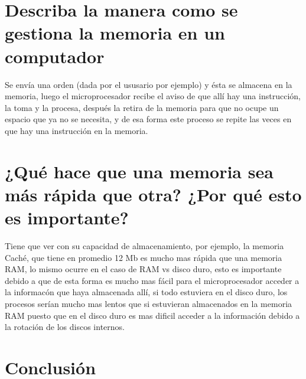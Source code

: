 \documentclass{article}
\begin{document}
\section{Describa la manera como se gestiona la memoria en un computador}
Se envía una orden (dada por el ususario por ejemplo) y ésta se almacena en la memoria, luego el microprocesador recibe el aviso de que allí hay una instrucción, la toma y la procesa, después la retira de la memoria para que no ocupe un espacio que ya no se necesita, y de esa forma este proceso se repite las veces en que hay una instrucción en la memoria.

\section{¿Qué hace que una memoria sea más rápida que otra? ¿Por qué esto es importante?}
Tiene que ver con su capacidad de almacenamiento, por ejemplo, la memoria Caché, que tiene en promedio 12 Mb es mucho mas rápida que una memoria RAM, lo mismo ocurre en el caso de RAM vs disco duro, esto es importante debido a que de esta forma es mucho mas fácil para el microprocesador acceder a la informacón que haya almacenada allí, si todo estuviera en el disco duro, los procesos serían mucho mas lentos que si estuvieran almacenados en la memoria RAM puesto que en el disco duro es mas dificil acceder a la información debido a la rotación de los discos internos.


\section{Conclusión} \label{conclulsion}



\end{document}
